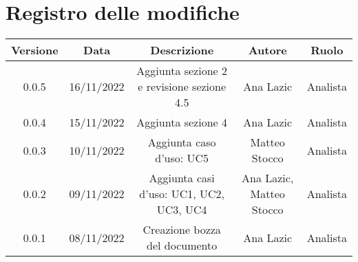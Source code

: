 \section*{Registro delle modifiche}
\begin{center}
\begin{tabular}{| c | c | c | c | c |} 
\hline
 \textbf{Versione} & \textbf{Data} & \textbf{Descrizione} & \textbf{Autore} & \textbf{Ruolo}\\
 \hline
0.0.5 & 16/11/2022	 & Aggiunta sezione 2 e revisione sezione 4.5 & Ana Lazic & Analista\\
 \hline
0.0.4 & 15/11/2022	 & Aggiunta sezione 4 & Ana Lazic & Analista\\
 \hline
0.0.3 & 10/11/2022 & Aggiunta caso d’uso: UC5 & Matteo Stocco & Analista\\
 \hline
0.0.2 & 09/11/2022	 & Aggiunta casi d’uso: UC1, UC2, UC3, UC4 & Ana Lazic, Matteo Stocco & Analista\\
 \hline
0.0.1 & 08/11/2022 & Creazione bozza del documento & Ana Lazic & Analista\\
 \hline
\end{tabular}
\end{center}
